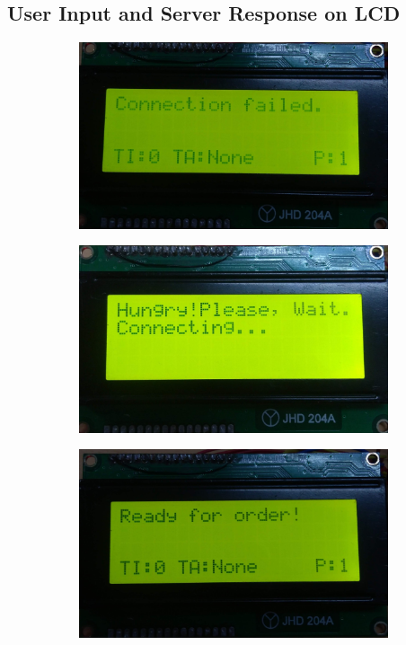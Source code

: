 \documentclass[12pt,a4paper]{article}
\begin{document}
    	\subsection{User Input and Server Response on LCD}
	\begin{figure}[h]
		\centering
		\begin{subfigure}{.5\textwidth}
			\centering
			\includegraphics[width=1\textwidth]{con_failed}
		\end{subfigure}%
		\begin{subfigure}{.5\textwidth}
			\centering
			\includegraphics[width=1\textwidth]{entry}
		\end{subfigure}
		\begin{subfigure}{.5\textwidth}
			\centering
			\includegraphics[width=1\textwidth]{ready}

\end{subfigure}
\end{figure}
\end{document}
